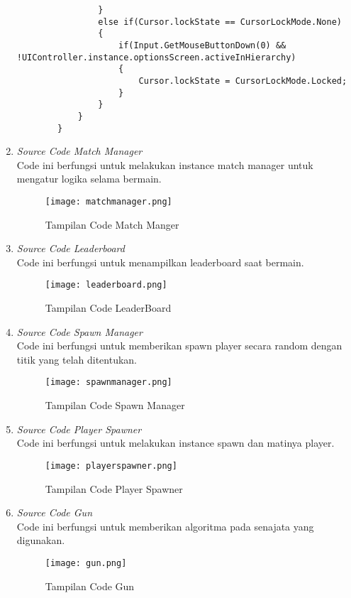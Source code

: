 \begin{enumerate}
\begin{lstlisting}
                }
                else if(Cursor.lockState == CursorLockMode.None)
                {
                    if(Input.GetMouseButtonDown(0) && !UIController.instance.optionsScreen.activeInHierarchy)
                    {
                        Cursor.lockState = CursorLockMode.Locked;
                    }
                }
            }
        }      
    \end{lstlisting}
    \newpage
    \item \textit{Source Code Match Manager} \\
    Code ini berfungsi untuk melakukan instance match manager untuk mengatur logika selama bermain.
    \begin{figure}[h]
        \centering
        \texttt{[image: matchmanager.png]}
        \caption{Tampilan Code Match Manger}
        \label{fig:matchmanager}
    \end{figure}
    \item \textit{Source Code Leaderboard} \\ 
    Code ini berfungsi untuk menampilkan leaderboard saat bermain.
    \begin{figure}[h]
        \centering
        \texttt{[image: leaderboard.png]}
        \caption{Tampilan Code LeaderBoard}
        \label{fig:leaderboard}
    \end{figure}
    \item \textit{Source Code Spawn Manager}\\
    Code ini berfungsi untuk memberikan spawn player secara random dengan titik yang telah ditentukan.
    \newpage
    \begin{figure}[h]
        \centering
        \texttt{[image: spawnmanager.png]}
        \caption{Tampilan Code Spawn Manager}
        \label{fig:spawnmanager}
    \end{figure}
    \item \textit{Source Code Player Spawner} \\ 
    Code ini berfungsi untuk melakukan instance spawn dan matinya player.
    \begin{figure}[h]
        \centering
        \texttt{[image: playerspawner.png]}
        \caption{Tampilan Code Player Spawner}
        \label{fig:playerspawner}
    \end{figure}
    \item \textit{Source Code Gun} \\ 
    Code ini berfungsi untuk memberikan algoritma pada senajata yang digunakan.
    \newpage
    \begin{figure}[h]
        \centering
        \texttt{[image: gun.png]}
        \caption{Tampilan Code Gun}
        \label{fig:gun}
    \end{figure}
\end{enumerate}

